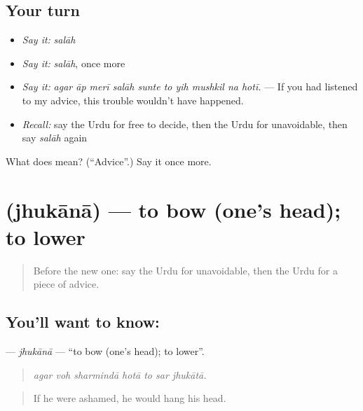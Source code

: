 \subsection*{Your turn}
\begin{itemize}
\raggedright
  \item \emph{Say it:} \emph{salāh}
  \item \emph{Say it:} \emph{salāh}, once more
  \item \emph{Say it:} \emph{agar āp merī salāh sunte to yih mushkil na hotī.} — If you had listened to my advice, this trouble wouldn't have happened.
  \item \emph{Recall:} say the Urdu for free to decide, then the Urdu for unavoidable, then say \emph{salāh} again
\end{itemize}

\begin{tcolorbox}[breakable,colback=teal!4,colframe=teal!35!black,title={Before you move on}]
What does  mean? (\textquotedblleft{}Advice\textquotedblright{}.) Say it once more.
\end{tcolorbox}
\section[\texorpdfstring{\ur{جھکانا} (jhukānā)}{جھکانا (jhukānā)}]{ (jhukānā) — to bow (one's head); to lower}

\label{lesson:UR-C539-jhukana}



\begin{quote}
Before the new one: say the Urdu for unavoidable, then the Urdu for a piece of advice.
\end{quote}

\subsection*{You'll want to know: }
\textbf{} — \emph{jhukānā} — \textquotedblleft{}to bow (one's head); to lower\textquotedblright{}.

\begin{quote}
      
\end{quote}

\begin{quote}
\emph{agar voh sharmindā hotā to sar jhukātā.}
\end{quote}

\begin{quote}
If he were ashamed, he would hang his head.
\end{quote}

